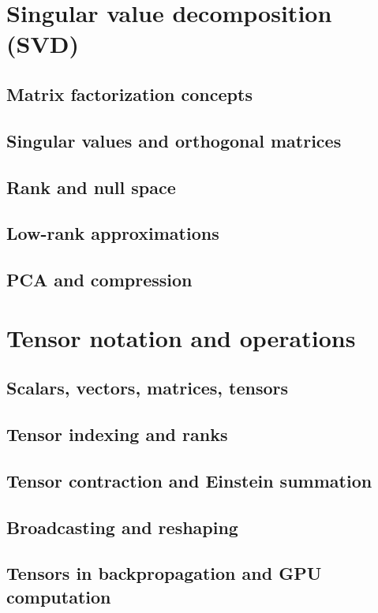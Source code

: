 \section{Singular value decomposition (SVD)}
\subsection{Matrix factorization concepts}
\subsection{Singular values and orthogonal matrices}
\subsection{Rank and null space}
\subsection{Low-rank approximations}
\subsection{PCA and compression}

\section{Tensor notation and operations}
\subsection{Scalars, vectors, matrices, tensors}
\subsection{Tensor indexing and ranks}
\subsection{Tensor contraction and Einstein summation}
\subsection{Broadcasting and reshaping}
\subsection{Tensors in backpropagation and GPU computation}

